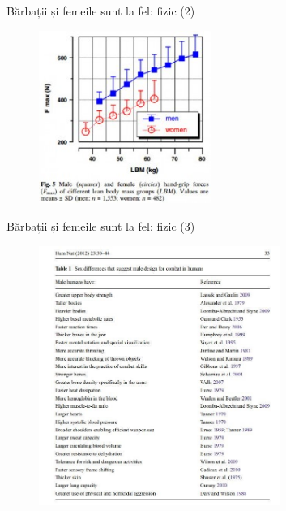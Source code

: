 \documentclass{beamer}
\begin{document}
\begin{frame}{Bărbații și femeile sunt la fel: fizic (2)}
  \centering
  \begin{figure}
    \includegraphics[width=0.5\textwidth]{img/male-female-grip}
  \end{figure}
\end{frame}

\begin{frame}{Bărbații și femeile sunt la fel: fizic (3)}
  \centering
  \begin{figure}
    \includegraphics[width=0.7\textwidth]{img/male-combat}
  \end{figure}
\end{frame}
\end{document}
